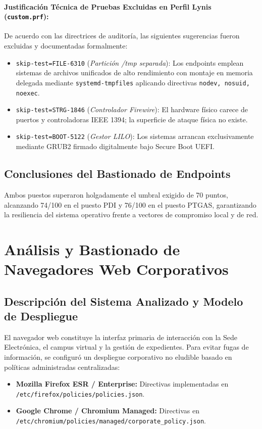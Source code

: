 \documentclass[11pt,a4paper]{article}
\begin{document}
\paragraph{Justificación Técnica de Pruebas Excluidas en Perfil Lynis (\texttt{custom.prf}):}
De acuerdo con las directrices de auditoría, las siguientes sugerencias fueron excluidas y documentadas formalmente:
\begin{itemize}[noitemsep]
    \item \texttt{skip-test=FILE-6310} (\textit{Partición /tmp separada}): Los endpoints emplean sistemas de archivos unificados de alto rendimiento con montaje en memoria delegada mediante \texttt{systemd-tmpfiles} aplicando directivas \texttt{nodev, nosuid, noexec}.
    \item \texttt{skip-test=STRG-1846} (\textit{Controlador Firewire}): El hardware físico carece de puertos y controladoras IEEE 1394; la superficie de ataque física no existe.
    \item \texttt{skip-test=BOOT-5122} (\textit{Gestor LILO}): Los sistemas arrancan exclusivamente mediante GRUB2 firmado digitalmente bajo Secure Boot UEFI.
\end{itemize}

\subsection{Conclusiones del Bastionado de Endpoints}
Ambos puestos superaron holgadamente el umbral exigido de 70 puntos, alcanzando 74/100 en el puesto PDI y 76/100 en el puesto PTGAS, garantizando la resiliencia del sistema operativo frente a vectores de compromiso local y de red.

\section{Análisis y Bastionado de Navegadores Web Corporativos}

\subsection{Descripción del Sistema Analizado y Modelo de Despliegue}
El navegador web constituye la interfaz primaria de interacción con la Sede Electrónica, el campus virtual y la gestión de expedientes. Para evitar fugas de información, se configuró un despliegue corporativo no eludible basado en políticas administradas centralizadas:
\begin{itemize}[noitemsep]
    \item \textbf{Mozilla Firefox ESR / Enterprise:} Directivas implementadas en \texttt{/etc/firefox/policies/policies.json}.
    \item \textbf{Google Chrome / Chromium Managed:} Directivas en \texttt{/etc/chromium/policies/managed/corporate\_policy.json}.
\end{itemize}
\end{document}
